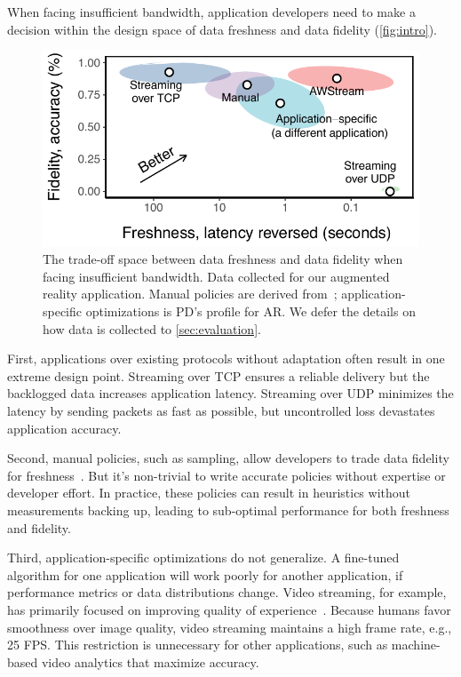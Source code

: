 When facing insufficient bandwidth, application developers need to make a
decision within the design space of data freshness and data fidelity
(\autoref{fig:intro}).

\begin{figure}
  \centering
  \includegraphics[width=0.9\columnwidth]{figures/figure1a.pdf}
  \caption{The trade-off space between data freshness and data fidelity when
    facing insufficient bandwidth. Data collected for our augmented reality
    application. 
    Manual policies are derived from~\cite{rabkin2014aggregation};
    application-specific optimizations is PD's profile for AR. We defer the
    details on how data is collected to \autoref{sec:evaluation}.}
  \label{fig:intro}
  \vspace{-1em}
\end{figure}

First, applications over existing protocols without adaptation often result in one
extreme design point. Streaming over TCP ensures a reliable
delivery but the backlogged data increases application latency. Streaming over
UDP minimizes the latency by sending packets as fast as possible, but
uncontrolled loss devastates application accuracy.

Second, manual policies, such as sampling, allow developers to trade data
fidelity for freshness~\cite{rabkin2014aggregation}. But it's non-trivial to
write accurate policies without expertise or developer effort. In practice,
these policies can result in heuristics without measurements backing up, leading
to sub-optimal performance for both freshness and fidelity.

Third, application-specific optimizations do not generalize. A fine-tuned
algorithm for one application will work poorly for another application, if
performance metrics or data distributions change. Video streaming, for
example, has primarily focused on improving quality of
experience~\cite{yin2015control}. Because humans favor smoothness over image
quality, video streaming maintains a high frame rate, e.g., 25 FPS. This
restriction is unnecessary for other applications, such as machine-based video
analytics that maximize accuracy.

